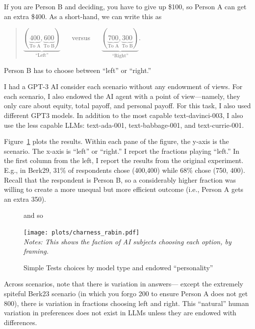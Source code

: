 \documentclass[11pt]{article}
\begin{document}
If you are Person B and deciding, you have to give up \$100, so Person A can get an extra \$400.
As a short-hand, we can write this as
\begin{quote}
  $\underbrace{(\underbrace{400}_{\mbox{To A}}, \underbrace{600}_{\mbox{To B}})}_{\mbox{``Left''}}$ $\quad$ versus $\quad$ $\underbrace{(\underbrace{700}_{\mbox{To A}}, \underbrace{300}_{\mbox{To B}})}_{\mbox{``Right''}}$.
\end{quote}
Person B has to choose between ``left'' or ``right.''

I had a GPT-3 AI consider each scenario without any endowment of views.
For each scenario, I also endowed the AI agent with a point of view---namely, they only care about equity, total payoff, and personal payoff.
For this task, I also used different GPT3 models.
In addition to the most capable text-davinci-003, I also use the less capable LLMs: text-ada-001, text-babbage-001, and text-currie-001.

Figure~\ref{fig:charness_rabin} plots the results.
Within each pane of the figure, the y-axis is the scenario. The x-axis is ``left'' or ``right.''
I report the fractions playing ``left.''
In the first column from the left,  I report the results from the original experiment. 
E.g., in Berk29, 31\% of respondents chose (400,400) while 68\% chose (750, 400).
Recall that the respondent is Person B, so a considerably higher fraction was willing to create a more unequal but more efficient outcome (i.e., Person A gets an extra 350). 

\begin{figure}[h!]and so   \caption{\cite{charness2002understanding} Simple Tests choices by model type and endowed ``personality''} \label{fig:charness_rabin}
  \centering
  \begin{minipage}{0.99\textwidth}
    \texttt{[image: plots/charness\_rabin.pdf]}
{\footnotesize \\
  \emph{Notes: This shows the faction of AI subjects choosing each option, by framing.} 
}
\end{minipage} 
\end{figure}

Across scenarios, note that there is variation in answers--- except the extremely spiteful Berk23 scenario (in which you forgo 200 to ensure Person A does not get 800), there is variation in fractions choosing left and right.
This ``natural'' human variation in preferences does not exist in LLMs unless they are endowed with differences.
\end{document}
